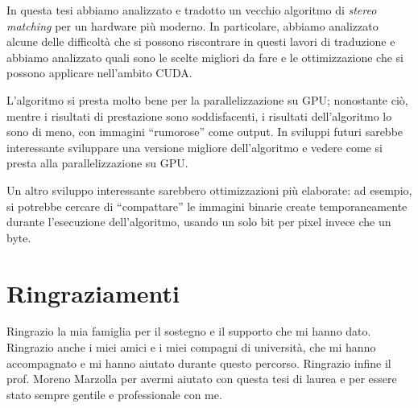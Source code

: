 \documentclass[12pt,a4paper,openright,twoside]{report}
\begin{document}

In questa tesi abbiamo analizzato e tradotto un vecchio algoritmo di \textit{stereo matching} per un hardware più moderno. In particolare, abbiamo analizzato alcune delle difficoltà che si possono riscontrare in questi lavori di traduzione e abbiamo analizzato quali sono le scelte migliori da fare e le ottimizzazione che si possono applicare nell'ambito CUDA.

L'algoritmo si presta molto bene per la parallelizzazione su GPU; nonostante ciò, mentre i risultati di prestazione sono soddisfacenti, i risultati dell'algoritmo lo sono di meno, con immagini ``rumorose'' come output. In sviluppi futuri sarebbe interessante sviluppare una versione migliore dell'algoritmo e vedere come si presta alla parallelizzazione su GPU.

Un altro sviluppo interessante sarebbero ottimizzazioni più elaborate: ad esempio, si potrebbe cercare di ``compattare'' le immagini binarie create temporaneamente durante l'esecuzione dell'algoritmo, usando un solo bit per pixel invece che un byte.

\clearpage{\pagestyle{empty}\cleardoublepage}






{}


\rhead[\fancyplain{}{\bfseries \leftmark}]{\fancyplain{}{\bfseries\thepage}}
\clearpage{\pagestyle{empty}\cleardoublepage}



\chapter*{Ringraziamenti}
\thispagestyle{empty}

Ringrazio la mia famiglia per il sostegno e il supporto che mi hanno dato. Ringrazio anche i miei amici e i miei compagni di università, che mi hanno accompagnato e mi hanno aiutato durante questo percorso. Ringrazio infine il prof. Moreno Marzolla per avermi aiutato con questa tesi di laurea e per essere stato sempre gentile e professionale con me.

\nocite{*}
\end{document}

